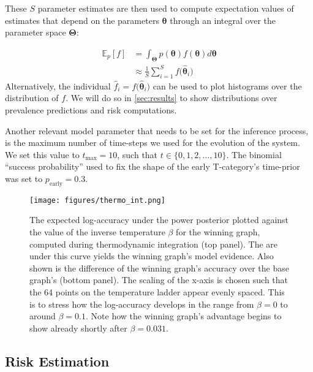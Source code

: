 \documentclass[twocolumn]{article}
\begin{document}
These $S$ parameter estimates are then used to compute expectation values of estimates that depend on the parameters $\boldsymbol{\theta}$ through an integral over the parameter space $\boldsymbol{\Theta}$:

\begin{equation}
    \begin{aligned}
        \mathbb{E}_p \left[ f \right] &= \int_{\boldsymbol{\Theta}} p(\boldsymbol{\theta}) f(\boldsymbol{\theta}) d\boldsymbol{\theta} \\
        &\approx \frac{1}{S} \sum_{i=1}^S f \big( \boldsymbol{\hat{\theta}}_i \big)
    \end{aligned}
\end{equation}
%
Alternatively, the individual $\hat{f}_i = f\big( \boldsymbol{\hat{\theta}}_i \big)$ can be used to plot histograms over the distribution of $f$. We will do so in \cref{sec:results} to show distributions over prevalence predictions and risk computations.

Another relevant model parameter that needs to be set for the inference process, is the maximum number of time-steps we used for the evolution of the system. We set this value to $t_\text{max} = 10$, such that $t \in \{ 0, 1, 2, \ldots, 10 \}$. The binomial ``success probability'' used to fix the shape of the early T-category's time-prior was set to $p_\text{early} = 0.3$.

\begin{figure}[t]
    \centering
    \texttt{[image: figures/thermo\_int.png]}
    \caption{The expected log-accuracy under the power posterior plotted against the value of the inverse temperature $\beta$ for the winning graph, computed during thermodynamic integration (top panel). The are under this curve yields the winning graph's model evidence. Also shown is the difference of the winning graph's accuracy over the base graph's (bottom panel). The scaling of the x-axis is chosen such that the 64 points on the temperature ladder appear evenly spaced. This is to stress how the log-accuracy develops in the range from $\beta=0$ to around $\beta=0.1$. Note how the winning graph's advantage begins to show already shortly after $\beta=0.031$.
    \label{fig:thermo_int}}
\end{figure}


\subsection{Risk Estimation}
\label{subsec:formalism:risk}
\end{document}
